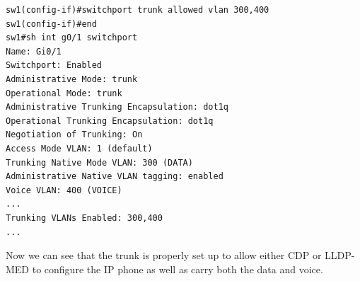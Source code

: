 \vspace{-15pt}
\begin{verbatim}
sw1(config-if)#switchport trunk allowed vlan 300,400
sw1(config-if)#end
sw1#sh int g0/1 switchport
Name: Gi0/1
Switchport: Enabled
Administrative Mode: trunk
Operational Mode: trunk
Administrative Trunking Encapsulation: dot1q
Operational Trunking Encapsulation: dot1q
Negotiation of Trunking: On
Access Mode VLAN: 1 (default)
Trunking Native Mode VLAN: 300 (DATA)
Administrative Native VLAN tagging: enabled
Voice VLAN: 400 (VOICE)
...
Trunking VLANs Enabled: 300,400
...
\end{verbatim}
\vspace{-10pt}

\noindent
Now we can see that the trunk is properly set up to allow either CDP or LLDP-MED to configure the IP phone as well as carry both the data and voice. 